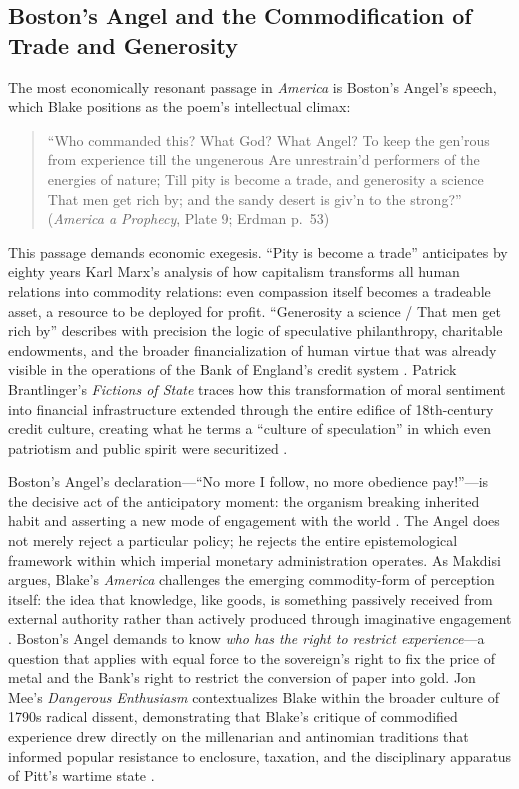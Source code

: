 \documentclass[
]{article}
\begin{document}
\subsection{Boston's Angel and the Commodification of Trade and
Generosity}\label{bostons-angel-and-the-commodification-of-trade-and-generosity}

The most economically resonant passage in \emph{America} is Boston's
Angel's speech, which Blake positions as the poem's intellectual climax:

\begin{quote}
``Who commanded this? What God? What Angel? To keep the gen'rous from
experience till the ungenerous Are unrestrain'd performers of the
energies of nature; Till pity is become a trade, and generosity a
science That men get rich by; and the sandy desert is giv'n to the
strong?'' (\emph{America a Prophecy}, Plate 9; Erdman p.~53)
\citep{erdman1988complete, blake1793america}
\end{quote}

This passage demands economic exegesis. ``Pity is become a trade''
anticipates by eighty years Karl Marx's analysis of how capitalism
transforms all human relations into commodity relations: even compassion
itself becomes a tradeable asset, a resource to be deployed for profit.
``Generosity a science / That men get rich by'' describes with precision
the logic of speculative philanthropy, charitable endowments, and the
broader financialization of human virtue that was already visible in the
operations of the Bank of England's credit system
\citep{poovey2008genres}. Patrick Brantlinger's \emph{Fictions of State}
traces how this transformation of moral sentiment into financial
infrastructure extended through the entire edifice of 18th-century
credit culture, creating what he terms a ``culture of speculation'' in
which even patriotism and public spirit were securitized
\citep{brantlinger1996fictions}.

Boston's Angel's declaration---``No more I follow, no more obedience
pay!''---is the decisive act of the anticipatory moment: the organism
breaking inherited habit and asserting a new mode of engagement with the
world \citep{friedman2026blake}. The Angel does not merely reject a
particular policy; he rejects the entire epistemological framework
within which imperial monetary administration operates. As Makdisi
argues, Blake's \emph{America} challenges the emerging commodity-form of
perception itself: the idea that knowledge, like goods, is something
passively received from external authority rather than actively produced
through imaginative engagement \citep{makdisi2003william}. Boston's
Angel demands to know \emph{who has the right to restrict
experience}---a question that applies with equal force to the
sovereign's right to fix the price of metal and the Bank's right to
restrict the conversion of paper into gold. Jon Mee's \emph{Dangerous
Enthusiasm} contextualizes Blake within the broader culture of 1790s
radical dissent, demonstrating that Blake's critique of commodified
experience drew directly on the millenarian and antinomian traditions
that informed popular resistance to enclosure, taxation, and the
disciplinary apparatus of Pitt's wartime state \citep{mee1992dangerous}.
\end{document}
